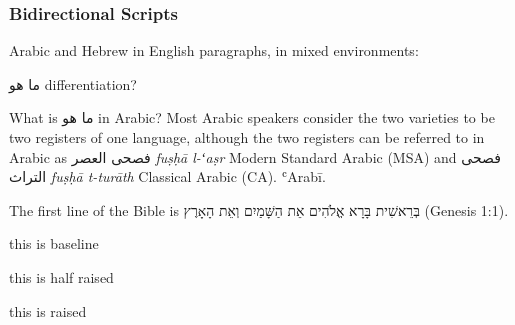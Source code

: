


\subsubsection{Bidirectional Scripts}

Arabic and Hebrew in English paragraphs, in mixed environments:

ما هو \foreignlanguage{english}{differentiation}? 

What is ما هو in Arabic?
\medskip
\textnormal
\noindent Most Arabic speakers consider the two varieties to be two registers
of one language, although the two registers can be referred to in
Arabic as فصحى العصر \textit{fuṣḥā l-ʻaṣr} Modern Standard Arabic (MSA) and
فصحى التراث \textit{fuṣḥā t-turāth} Classical Arabic (CA). ʿArab\={i}.

\medskip

The first line of the Bible is בְּרֵאשִׁית בָּרָא אֱלֹהִים אֵת הַשָּׁמַיִם וְאֵת הָאָרֶץ (Genesis 1:1).



\noindent{\color{black}\rule{\linewidth}{0.2mm}} 

\noindent{\color{black}\rule{0.25\linewidth}{0.2mm}} this is baseline

\noindent{\color{black}\rule[0.5ex]{0.25\linewidth}{0.2mm}} this is half raised

\noindent{\color{black}\rule[1ex]{0.25\linewidth}{0.2mm}} this is raised

